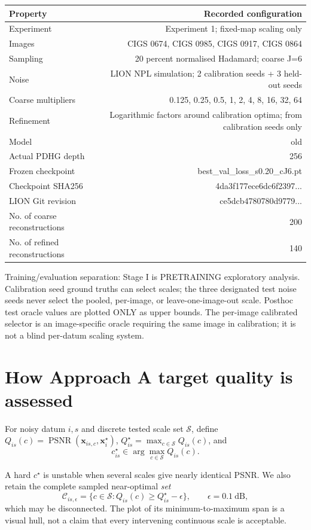 \documentclass[11pt,a4paper]{article}
\begin{document}
\begin{center}
\small
\begin{tabular}{lr}
\toprule
Property & Recorded configuration\\
\midrule
Experiment & Experiment 1; fixed-map scaling only\\
Images & CIGS 0674, CIGS 0985, CIGS 0917, CIGS 0864\\
Sampling & 20 percent normalised Hadamard; coarse J=6\\
Noise & LION NPL simulation; 2 calibration seeds + 3 held-out seeds\\
Coarse multipliers & 0.125, 0.25, 0.5, 1, 2, 4, 8, 16, 32, 64\\
Refinement & Logarithmic factors around calibration optima; from calibration seeds only\\
Model & old\\
Actual PDHG depth & 256\\
Frozen checkpoint & best\_val\_loss\_s0.20\_cJ6.pt\\
Checkpoint SHA256 & 4da3f177ece6dc6f2397...\\
LION Git revision & ce5dcb4780780d9779...\\
No. of coarse reconstructions & 200\\
No. of refined reconstructions & 140\\
\bottomrule
\end{tabular}
\end{center}

Training/evaluation separation: Stage I is PRETRAINING exploratory analysis. Calibration seed ground truths can select scales; the three designated test noise seeds never select the pooled, per-image, or leave-one-image-out scale. Posthoc test oracle values are plotted ONLY as upper bounds. The per-image calibrated selector is an image-specific oracle requiring the same image in calibration; it is not a blind per-datum scaling system.

\section{How Approach A target quality is assessed}

For noisy datum $i,s$ and discrete tested scale set $\mathcal S$, define $Q_{is}(c)=\operatorname{PSNR}(\boldsymbol x_{is,c},\boldsymbol x_i^\star)$, $Q_{is}^\star=\max_{c\in\mathcal S} Q_{is}(c)$, and\[c_{is}^\star\in\arg\max_{c\in\mathcal S}Q_{is}(c).\]

A hard $c^\star$ is unstable when several scales give nearly identical PSNR. We also retain the complete sampled near-optimal \emph{set}\[\mathcal C_{is,\epsilon}=\{c\in\mathcal S:Q_{is}(c)\ge Q_{is}^\star-\epsilon\},\qquad \epsilon=0.1\ \mathrm{dB},\]which may be disconnected. The plot of its minimum-to-maximum span is a visual hull, not a claim that every intervening continuous scale is acceptable.
\end{document}

